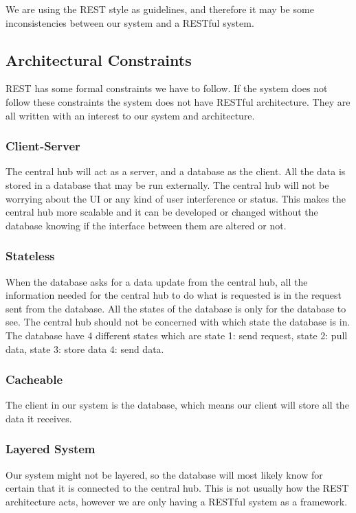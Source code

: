 \documentclass[../document.tex]{subfiles}
\begin{document}
We are using the \gls{REST} style as guidelines, and therefore it may be some inconsistencies between our system and a RESTful system. 

\subsection{Architectural Constraints}
\gls{REST} has some formal constraints we have to follow. If the system does not follow these constraints the system does not have RESTful architecture. They are all written with an interest to our system and architecture.

\subsubsection{Client-Server}
The central hub will act as a server, and a database as the client. All the data is stored in a database that may be run externally. The central hub will not be worrying about the UI or any kind of user interference or status. This makes the central hub more scalable and it can be developed or changed without the database knowing if the interface between them are altered or not. 

\subsubsection{Stateless}
When the database asks for a data update from the central hub, all the information needed for the central hub to do what is requested is in the request sent from the database. All the states of the database is only for the database to see. The central hub should not be concerned with which state the database is in. The database have 4 different states which are state 1: send request, state 2: pull data, state 3: store data 4: send data.

\subsubsection{Cacheable}
The client in our system is the database, which means our client will store all the data it receives. 

\subsubsection{Layered System}
Our system might not be layered, so the database will most likely know for certain that it is connected to the central hub. This is not usually how the \gls{REST} architecture acts, however we are only having a RESTful system as a framework. 
\end{document}
